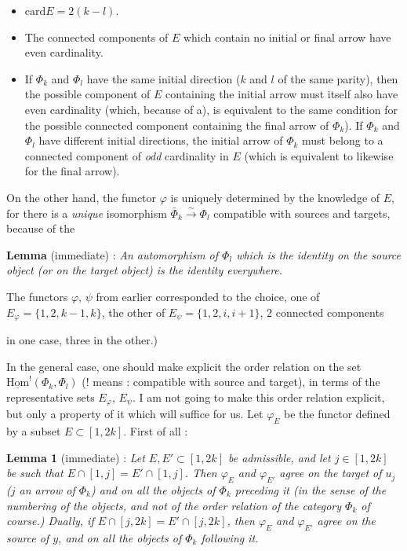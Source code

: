 \documentclass[11pt]{article}
\newcommand{\printedpage}[1]{\marginpar{\footnotesize p.~#1}}
\newcommand{\msp}[1]{\marginpar{\footnotesize [#1]}}
\newcommand{\card}{\mathrm{card}}
\newcommand{\uHom}{\underline{\mathrm{Hom}}}
\begin{document}
\begin{itemize}
\item[a)] $\card E=2(k-l)$.
\item[b)] The connected components of $E$ which contain no initial or final arrow have even cardinality.
\item[c)] If $\Phi_k$ and $\Phi_l$ have the same initial direction ($k$ and $l$ of the same parity), then the possible component of $E$ containing the initial arrow must itself also have even cardinality (which, because of a), is equivalent to the same condition for the possible connected component containing the final arrow of $\Phi_k$). If $\Phi_k$ and $\Phi_l$ have different initial directions, the initial arrow of $\Phi_k$ must belong to a connected component of \textit{odd} cardinality in $E$ (which is equivalent to likewise for the final arrow).
\end{itemize}

On the other hand, the functor $\varphi$ is uniquely determined by the knowledge of $E$, for there is a \textit{unique} isomorphism $\bar{\Phi}_k\xrightarrow{\sim}\Phi_l$ compatible with sources and targets, because of the

\textbf{Lemma} (immediate) : \textit{An automorphism of $\Phi_l$ which is the identity on the source object (or on the target object) is the identity everywhere.}

The functors $\varphi$, $\psi$ from earlier corresponded to the choice, one of $E_\varphi=\{1,2,k-1,k\}$, the other of $E_\psi=\{1,2,i,i+1\}$, 2 connected components

\msp{page 20}
in one case, three in the other.) %


\printedpage{13}

In the general case, one should make explicit the order relation on the set $\uHom^{!}(\Phi_k,\Phi_l)$ (! means : compatible with source and target), in terms of the representative sets $E_\varphi$, $E_\psi$. I am not going to make this order relation explicit, but only a property of it which will suffice for us. Let $\varphi_E$ be the functor defined by a subset $E\subset[1,2k]$. First of all :

\textbf{Lemma 1} (immediate) : \textit{Let $E,E'\subset[1,2k]$ be admissible, and let $j\in[1,2k]$ be such that $E\cap[1,j]=E'\cap[1,j]$. Then $\varphi_E$ and $\varphi_{E'}$ agree on the target of $u_j$ ($j$ an arrow of $\Phi_k$) and on all the objects of $\Phi_k$ preceding it (in the sense of the numbering of the objects, and not of the order relation of the category $\Phi_k$ of course.) Dually, if $E\cap[j,2k]=E'\cap[j,2k]$, then $\varphi_E$ and $\varphi_{E'}$ agree on the source of $y$, and on all the objects of $\Phi_k$ following it.} %
\end{document}

